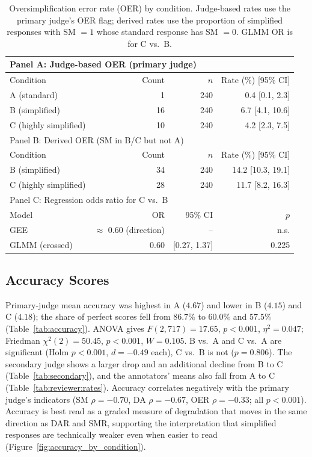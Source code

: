 \documentclass[journal,article,submit,pdftex,moreauthors]{Definitions/mdpi}
\begin{document}
\begin{table}[H]
\caption{Oversimplification error rate (OER) by condition. Judge-based rates use the primary judge's OER flag; derived rates use the proportion of simplified responses with SM $= 1$ whose standard response has SM $= 0$. GLMM OR is for C vs.\ B.}
\label{tab:oer}
\centering
\small
\begin{tabular}{lrrr}
\toprule
\multicolumn{4}{l}{Panel A: Judge-based OER (primary judge)} \\
\midrule
Condition & Count & $n$ & Rate (\%) [95\% CI] \\
\midrule
A (standard) & 1 & 240 & 0.4 [0.1, 2.3] \\
B (simplified) & 16 & 240 & 6.7 [4.1, 10.6] \\
C (highly simplified) & 10 & 240 & 4.2 [2.3, 7.5] \\
\midrule
\multicolumn{4}{l}{Panel B: Derived OER (SM in B/C but not A)} \\
\midrule
Condition & Count & $n$ & Rate (\%) [95\% CI] \\
\midrule
B (simplified) & 34 & 240 & 14.2 [10.3, 19.1] \\
C (highly simplified) & 28 & 240 & 11.7 [8.2, 16.3] \\
\midrule
\multicolumn{4}{l}{Panel C: Regression odds ratio for C vs.\ B} \\
\midrule
Model & OR & 95\% CI & $p$ \\
\midrule
GEE & $\approx$ 0.60 (direction) & -- & n.s. \\
GLMM (crossed) & 0.60 & [0.27, 1.37] & 0.225 \\
\bottomrule
\end{tabular}
\end{table}

\subsection{Accuracy Scores}

Primary-judge mean accuracy was highest in A ($4.67$) and lower in B ($4.15$) and C ($4.18$); the share of perfect scores fell from $86.7\%$ to $60.0\%$ and $57.5\%$ (Table~\ref{tab:accuracy}). ANOVA gives $F(2, 717) = 17.65$, $p < 0.001$, $\eta^2 = 0.047$; Friedman $\chi^2(2) = 50.45$, $p < 0.001$, $W = 0.105$. B vs.\ A and C vs.\ A are significant (Holm $p < 0.001$, $d = -0.49$ each), C vs.\ B is not ($p = 0.806$). The secondary judge shows a larger drop and an additional decline from B to C (Table~\ref{tab:secondary}), and the annotators' means also fall from A to C (Table~\ref{tab:reviewer:rates}). Accuracy correlates negatively with the primary judge's indicators (SM $\rho = -0.70$, DA $\rho = -0.67$, OER $\rho = -0.33$; all $p < 0.001$). Accuracy is best read as a graded measure of degradation that moves in the same direction as DAR and SMR, supporting the interpretation that simplified responses are technically weaker even when easier to read (Figure~\ref{fig:accuracy_by_condition}).
\end{document}
